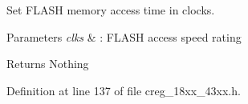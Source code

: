 Set F\+L\+A\+SH memory access time in clocks. 


\begin{DoxyParams}{Parameters}
{\em clks} & \+: F\+L\+A\+SH access speed rating \\
\hline
\end{DoxyParams}
\begin{DoxyReturn}{Returns}
Nothing 
\end{DoxyReturn}


Definition at line 137 of file creg\+\_\+18xx\+\_\+43xx.\+h.

